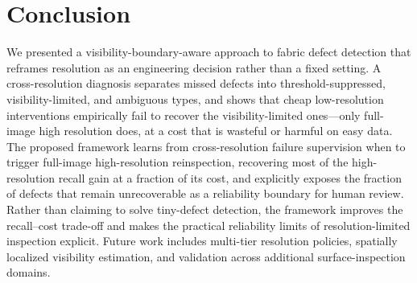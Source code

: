 \section{Conclusion}
\label{sec:conclusion}

We presented a visibility-boundary-aware approach to fabric defect detection
that reframes resolution as an engineering decision rather than a fixed setting.
A cross-resolution diagnosis separates missed defects into threshold-suppressed,
visibility-limited, and ambiguous types, and shows that cheap low-resolution
interventions empirically fail to recover the visibility-limited ones---only
full-image high resolution does, at a cost that is wasteful or harmful on easy
data. The proposed framework learns from cross-resolution failure supervision
when to trigger full-image high-resolution reinspection, recovering most of the
high-resolution recall gain at a fraction of its cost, and explicitly exposes
the fraction of defects that remain unrecoverable as a reliability boundary for
human review. Rather than claiming to solve tiny-defect detection, the framework
improves the recall--cost trade-off and makes the practical reliability limits
of resolution-limited inspection explicit. Future work includes multi-tier
resolution policies, spatially localized visibility estimation, and validation
across additional surface-inspection domains.
